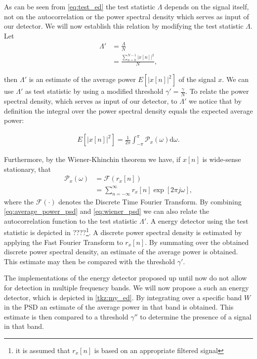 \documentclass[a4paper, openany, oneside]{memoir}
\begin{document}
As can be seen from \cref{eq:test_ed} the test statistic $\Lambda$ depends on the signal itself, not on the autocorrelation or the power spectral density which serves as input of our detector. We will now establish this relation by modifying the test statistic $\Lambda$.
Let 
\begin{align*}
\Lambda' &= \frac{\Lambda}{N}\\
	&= \frac{\sum_{n=0}^{N-1} |x[n]|^2}{N},
\end{align*}

then $\Lambda'$ is an estimate of the average power $E\left[|x[n]|^2\right]$ of the signal $x$. We can use $\Lambda'$ as test statistic by using a modified threshold $\gamma' = \frac{\gamma}{N}$. To relate the power spectral density, which serves as input of our detector, to $\Lambda'$  we notice that by definition the integral over the power spectral density equals the expected average power:

\begin{align}\label{eq:average_power_psd}
E\left[\left|x[n]\right|^2\right] = \frac{1}{2\pi} \int_{-\pi}^{\pi}\mathcal{P}_x(\omega) \text{d}\omega.
\end{align}

Furthermore, by the Wiener-Khinchin theorem we have, if $x[n]$ is wide-sense stationary, that
\begin{align}\label{eq:wiener_psd}
	\mathcal{P}_x(\omega) &= \mathcal{F}(r_x[n]) \\
	&= \sum_{n=-\infty}^{\infty} r_x[n] \exp [2\pi j\omega],
\end{align}
where the $\mathcal{F}(\cdot)$ denotes the Discrete Time Fourier Transform. 
By combining \cref{eq:average_power_psd} and \cref{eq:wiener_psd} we can also relate the autocorrelation function to the test statistic $\Lambda'$. A energy detector using the test statistic is depicted in ????\footnote{it is assumed that $r_x[n]$ is based on an appropriate filtered signal}. A discrete power spectral density is estimated by applying the Fast Fourier Transform to $r_x[n]$. By summating over the obtained discrete power spectral density, an estimate of the average power is obtained. This estimate may then be compared with the threshold $\gamma'$.  

The implementations of the energy detector proposed up until now do not allow for detection in multiple frequency bands. We will now propose a such an energy detector, which is depicted in \cref{tkz:my_ed}. By integrating over a specific band $W$ in the PSD an estimate of the average power in that band is obtained. This estimate is then compared to a threshold $\gamma''$ to determine the presence of a signal in that band.
\end{document}
